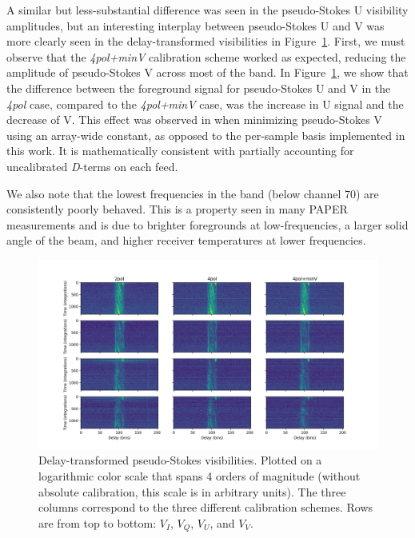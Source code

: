 A similar but less-substantial difference was seen in the pseudo-Stokes U visibility amplitudes, but an interesting interplay between pseudo-Stokes U and V was more clearly seen in the delay-transformed visibilities in Figure~\ref{fig:delay-stokes-grid}. First, we must observe that the \textit{4pol+minV} calibration scheme worked as expected, reducing the amplitude of pseudo-Stokes V across most of the band. In Figure~\ref{fig:delay-stokes-grid}, we show that the difference between the foreground signal for pseudo-Stokes U and V in the \textit{4pol} case, compared to the \textit{4pol+minV} case, was the increase in U signal and the decrease of V. This effect was observed in \cite{Kohn.16} when minimizing pseudo-Stokes V using an array-wide constant, as opposed to the per-sample basis implemented in this work. It is mathematically consistent with partially accounting for uncalibrated \textit{D}-terms on each feed.

We also note that the lowest frequencies in the band (below channel 70) are consistently poorly behaved. This is a property seen in many PAPER measurements \citep[e.g.][]{Jacobs.15, Moore.17} and is due to brighter foregrounds at low-frequencies, a larger solid angle of the beam, and higher receiver temperatures at lower frequencies.

\begin{figure}
\centering
\includegraphics[scale=0.5]{chapters/polcal/figures/dly.png}
\caption[Delay-transformed pseudo-Stokes visibilities.]{Delay-transformed pseudo-Stokes visibilities. Plotted on a logarithmic color scale that spans 4 orders of magnitude (without absolute calibration, this scale is in arbitrary units). The three columns correspond to the three different calibration schemes. Rows are from top to bottom: $V_I$, $V_Q$, $V_U$, and $V_V$.}
\label{fig:delay-stokes-grid}
\end{figure}

